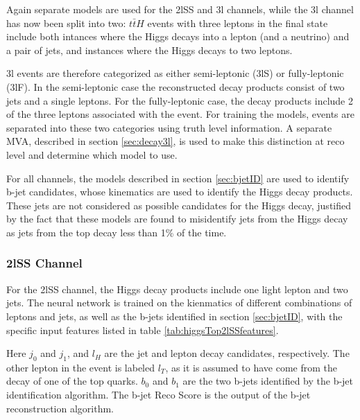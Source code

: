 Again separate models are used for the 2lSS and 3l channels, while the 3l channel has now been split into two: $t\bar{t}H$ events with three leptons in the final state include both intances where the Higgs decays into a lepton (and a neutrino) and a pair of jets, and instances where the Higgs decays to two leptons.

3l events are therefore categorized as either semi-leptonic (3lS) or fully-leptonic (3lF). In the semi-leptonic case the reconstructed decay products consist of two jets and a single leptons. For the fully-leptonic case, the decay products include 2 of the three leptons associated with the event. For training the models, events are separated into these two categories using truth level information. A separate MVA, described in section \ref{sec:decay3l}, is used to make this distinction at reco level and determine which model to use.

For all channels, the models described in section \ref{sec:bjetID} are used to identify b-jet candidates, whose kinematics are used to identify the Higgs decay products. These jets are not considered as possible candidates for the Higgs decay, justified by the fact that these models are found to misidentify jets from the Higgs decay as jets from the top decay less than 1\% of the time.

\subsubsection{2lSS Channel}
\label{subsec:higgs2lSS}

For the 2lSS channel, the Higgs decay products include one light lepton and two jets. The neural network is trained on the kienmatics of different combinations of leptons and jets, as well as the b-jets identified in section \ref{sec:bjetID}, with the specific input features listed in table \ref{tab:higgsTop2lSSfeatures}.



Here $j_0$ and $j_1$, and $l_H$ are the jet and lepton decay candidates, respectively. The other lepton in the event is labeled $l_T$, as it is assumed to have come from the decay of one of the top quarks. $b_0$ and $b_1$ are the two b-jets identified by the b-jet identification algorithm. The b-jet Reco Score is the output of the b-jet reconstruction algorithm.

